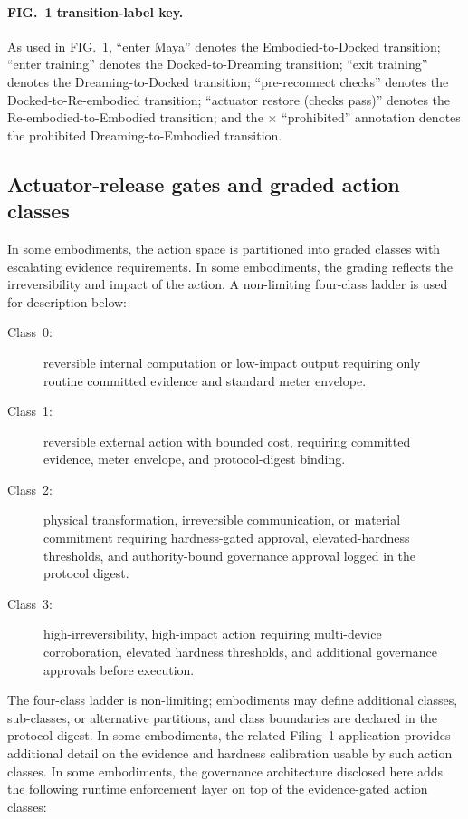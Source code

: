 \documentclass[a4paper,12pt]{article}
\begin{document}

\paragraph{FIG.~1 transition-label key.}
As used in FIG.~1, ``enter Maya'' denotes the Embodied-to-Docked
transition; ``enter training'' denotes the Docked-to-Dreaming
transition; ``exit training'' denotes the Dreaming-to-Docked
transition; ``pre-reconnect checks'' denotes the
Docked-to-Re-embodied transition; ``actuator restore (checks
pass)'' denotes the Re-embodied-to-Embodied transition; and the
$\times$ ``prohibited'' annotation denotes the prohibited
Dreaming-to-Embodied transition.

\subsection{Actuator-release gates and graded action classes}


In some embodiments, the action space is partitioned into graded
classes with escalating evidence requirements. In some embodiments,
the grading reflects the irreversibility and impact of the action.
A non-limiting four-class ladder is used for description below:
\begin{description}
  \item[Class~0:] reversible internal computation or low-impact
    output requiring only routine committed evidence and standard
    meter envelope.
  \item[Class~1:] reversible external action with bounded cost,
    requiring committed evidence, meter envelope, and protocol-digest
    binding.
  \item[Class~2:] physical transformation, irreversible
    communication, or material commitment requiring hardness-gated
    approval, elevated-hardness thresholds, and authority-bound
    governance approval logged in the protocol digest.
  \item[Class~3:] high-irreversibility, high-impact action requiring
    multi-device corroboration, elevated hardness thresholds, and
    additional governance approvals before execution.
\end{description}
The four-class ladder is non-limiting; embodiments may define
additional classes, sub-classes, or alternative partitions, and
class boundaries are declared in the protocol digest. In some
embodiments, the related Filing~1 application provides
additional detail on the evidence and hardness calibration usable
by such action classes. In some
embodiments, the governance
architecture disclosed here adds the following runtime enforcement
layer on top of the evidence-gated action classes:
\end{document}

